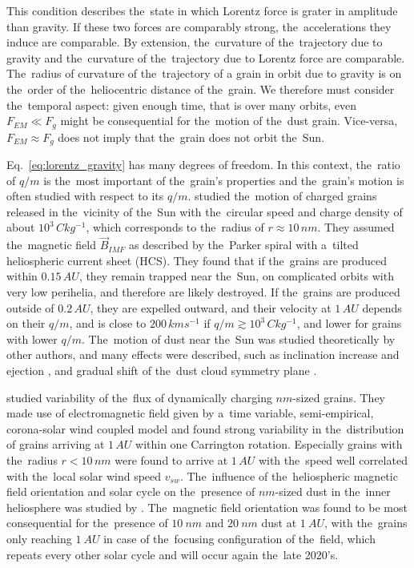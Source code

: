 This condition describes the~state in which Lorentz force is grater in amplitude than gravity. If these two forces are comparably strong, the~accelerations they induce are comparable. By extension, the~curvature of the~trajectory due to gravity and the~curvature of the~trajectory due to Lorentz force are comparable. The~radius of curvature of the~trajectory of a grain in orbit due to gravity is on the~order of the~heliocentric distance of the~grain. We therefore must consider the~temporal aspect: given enough time, that is over many orbits, even $F_{EM} \ll F_g$ might be consequential for the~motion of the~dust grain. Vice-versa, $F_{EM} \approx F_g$ does not imply that the~grain does not orbit the~Sun. 

Eq.~\ref{eq:lorentz_gravity} has many degrees of freedom. In this context, the~ratio of $q/m$ is the~most important of the~grain's properties and the~grain's motion is often studied with respect to its $q/m$. \citet{czechowski2010formation} studied the~motion of charged grains released in the~vicinity of the~Sun with the~circular speed and charge density of about $10^3 \, \si{C kg^{-1}}$, which corresponds to the~radius of $r \approx 10 \, \si{nm}$. They assumed the~magnetic field $\vec{B}_{IMF}$ as described by the~Parker spiral \citep{parker1958dynamics} with a~tilted heliospheric current sheet ({HCS}). They found that if the~grains are produced within $0.15 \, \si{AU}$, they remain trapped near the~Sun, on complicated orbits with very low perihelia, and therefore are likely destroyed. If the~grains are produced outside of $0.2 \, \si{AU}$, they are expelled outward, and their velocity at $1 \, \si{AU}$ depends on their $q/m$, and is close to $200 \, \si{km s^{-1}}$ if $q/m \gtrsim 10^3 \, \si{C kg^{-1}}$, and lower for grains with lower $q/m$. The~motion of dust near the~Sun was studied theoretically by other authors, and many effects were described, such as inclination increase and ejection \citep{krivov1998dynamics}, and gradual shift of the~dust cloud symmetry plane \citep{morfill1979motion}.

\citet{poppe2020effects} studied variability of the~flux of dynamically charging $\si{nm}$-sized grains. They made use of electromagnetic field given by a~time variable, semi-empirical, corona-solar wind coupled model and found strong variability in the~distribution of grains arriving at $1 \, \si{AU}$ within one Carrington rotation. Especially grains with the~radius $r<10 \, \si{nm}$ were found to arrive at $1 \, \si{AU}$ with the~speed well correlated with the~local solar wind speed $v_{sw}$. The~influence of the~heliospheric magnetic field orientation and solar cycle on the~presence of $\si{nm}$-sized dust in the~inner heliosphere was studied by \citet{poppe2022effects}. The~magnetic field orientation was found to be most consequential for the~presence of $\SI{10}{nm}$ and $\SI{20}{nm}$ dust at $\SI{1}{AU}$, with the~grains only reaching $\SI{1}{AU}$ in case of the~focusing configuration of the~field, which repeats every other solar cycle and will occur again the~late 2020's. 

